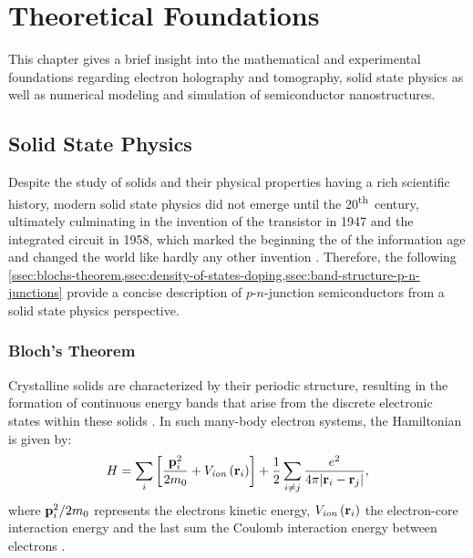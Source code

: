 \chapter{Theoretical Foundations} \label{chap:theoretical-foundations}
This chapter gives a brief insight into the mathematical and experimental foundations regarding electron holography and tomography, solid state physics as well as numerical modeling and simulation of semiconductor nanostructures.
\section{Solid State Physics} \label{sec:solid-state-physics}
Despite the study of solids and their physical properties having a rich scientific history, modern solid state physics did not emerge until the 20\textsuperscript{th}~century, ultimately culminating in the invention of the transistor in 1947 and the integrated circuit in 1958, which marked the beginning the of the information age and changed the world like hardly any other invention \cite{Alferov1998,Jenkins2005,Lukasiak2010,Klein2016}. Therefore, the following \cref{ssec:blochs-theorem,ssec:density-of-states-doping,ssec:band-structure-p-n-junctions} provide a concise description of $p$-$n$-junction semiconductors from a solid state physics perspective.
\subsection{Bloch's Theorem} \label{ssec:blochs-theorem}
Crystalline solids are characterized by their periodic structure, resulting in the formation of continuous energy bands that arise from the discrete electronic states within these solids \cite{Kittel1987,Piprek2003,Yu2010}. In such many-body electron systems, the Hamiltonian is given by:
\begin{equation}
  H = \sum_i \left[ \frac{\vb{p}_i^2}{2m_0} + V_{\mathit{ion}}\left(\vb{r}_i\right) \right] + \frac{1}{2} \sum_{i \neq j} \frac{e^2}{4\pi |\vb{r}_i - \vb{r}_j|},
\end{equation}
where $\vb{p}_i^2 / 2m_0$ represents the electrons kinetic energy, $V_{\mathit{ion}}\left(\vb{r}_i\right)$ the electron-core interaction energy and the last sum the Coulomb interaction energy between electrons \cite{Kittel1987,Piprek2003,Yu2010}.

